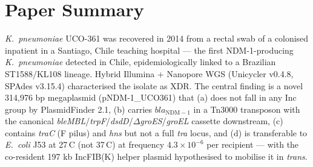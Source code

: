 \documentclass[11pt,letterpaper]{article}
\begin{document}
\section{Paper Summary}
\textit{K.\ pneumoniae} UCO-361 was recovered in 2014 from a rectal swab of a colonised inpatient
in a Santiago, Chile teaching hospital --- the first NDM-1-producing \textit{K.\ pneumoniae}
detected in Chile, epidemiologically linked to a Brazilian ST1588/KL108 lineage. Hybrid Illumina +
Nanopore WGS (Unicycler v0.4.8, SPAdes v3.15.4) characterised the isolate as XDR. The central
finding is a novel 314{,}976 bp megaplasmid (pNDM-1\_UCO361) that (a) does not fall in any Inc
group by PlasmidFinder 2.1, (b) carries $bla_{\mathrm{NDM-1}}$ in a Tn3000 transposon with the
canonical \textit{bleMBL}/\textit{trpF}/\textit{dsdD}/$\Delta$\textit{groES}/\textit{groEL} cassette
downstream, (c) contains \textit{traC} (F pilus) and \textit{hns} but not a full \textit{tra}
locus, and (d) is transferable to \textit{E.\ coli} J53 at 27\,\textdegree C (not 37\,\textdegree C)
at frequency $4.3\times10^{-6}$ per recipient --- with the co-resident 197 kb IncFIB(K) helper
plasmid hypothesised to mobilise it in \textit{trans}.
\end{document}
